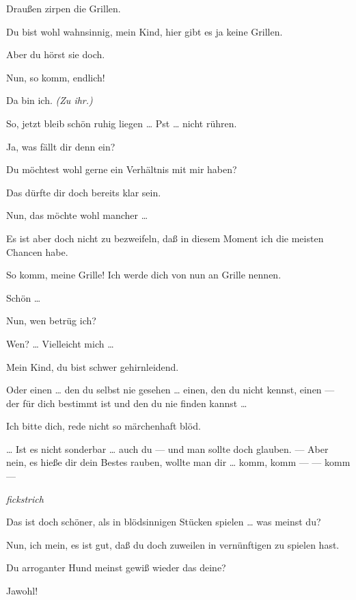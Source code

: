 \documentclass[
	final,
	a4paper,
	ngerman,
	mpinclude = true, %
	twoside = true,
	open = right,
	cleardoublepage = plain,
	DIV = 13,
	BCOR = 1cm,
	titlepage = firstiscover,
	]{scrbook}
\newcommand{\direction}[1]{\textit{(#1)}}
\newcommand{\hiat}{%
	\begin{center}
		\tiny
		\raisebox{0.5ex}{\rule{0.3\linewidth}{0.4pt}}
		\textit{fickstrich}
		\raisebox{0.5ex}{\rule{0.3\linewidth}{0.4pt}}
	\end{center}
}
\newcommand{\thecharacter}[1]{\textup{\textsc{#1}}\xspace}
\newcommand{\thedichter}{\thecharacter{Robert Bibitz}}
\newcommand{\theschauspielerin}{\thecharacter{Daniela}}
\newcommand{\character}[1]{\item[#1:]}
\newcommand{\dichter}{\character{\thedichter}}
\newcommand{\schauspielerin}{\character{\theschauspielerin}}
\begin{document}
\begin{play}
	\dichter
	Draußen zirpen die Grillen.

	\schauspielerin
	Du bist wohl wahnsinnig, mein Kind, hier gibt es ja keine Grillen.

	\dichter
	Aber du hörst sie doch.

	\schauspielerin
	Nun, so komm, endlich!

	\dichter
	Da bin ich. \direction{Zu ihr.}

	\schauspielerin
	So, jetzt bleib schön ruhig liegen \ldots{} Pst \ldots{} nicht rühren.

	\dichter
	Ja, was fällt dir denn ein?

	\schauspielerin
	Du möchtest wohl gerne ein Verhältnis mit mir haben?

	\dichter
	Das dürfte dir doch bereits klar sein.

	\schauspielerin
	Nun, das möchte wohl mancher \ldots{}

	\dichter
	Es ist aber doch nicht zu bezweifeln, daß in diesem Moment ich die meisten Chancen habe.

	\schauspielerin
	So komm, meine Grille! Ich werde dich von nun an Grille nennen.

	\dichter
	Schön \ldots{}

	\schauspielerin
	Nun, wen betrüg ich?

	\dichter
	Wen? \ldots{} Vielleicht mich \ldots{}

	\schauspielerin
	Mein Kind, du bist schwer gehirnleidend.

	\dichter
	Oder einen \ldots{} den du selbst nie gesehen \ldots{} einen, den du nicht kennst, einen --- der für dich bestimmt ist und den du nie finden kannst \ldots{}

	\schauspielerin
	Ich bitte dich, rede nicht so märchenhaft blöd.

	\dichter
	\ldots{} Ist es nicht sonderbar \ldots{} auch du --- und man sollte doch glauben. --- Aber nein, es hieße dir dein Bestes rauben, wollte man dir \ldots{} komm, komm --- --- komm ---

	\hiat

	\schauspielerin
	Das ist doch schöner, als in blödsinnigen Stücken spielen \ldots{} was meinst du?

	\dichter
	Nun, ich mein, es ist gut, daß du doch zuweilen in vernünftigen zu spielen hast.

	\schauspielerin
	Du arroganter Hund meinst gewiß wieder das deine?

	\dichter
	Jawohl!


\end{play}
\end{document}
